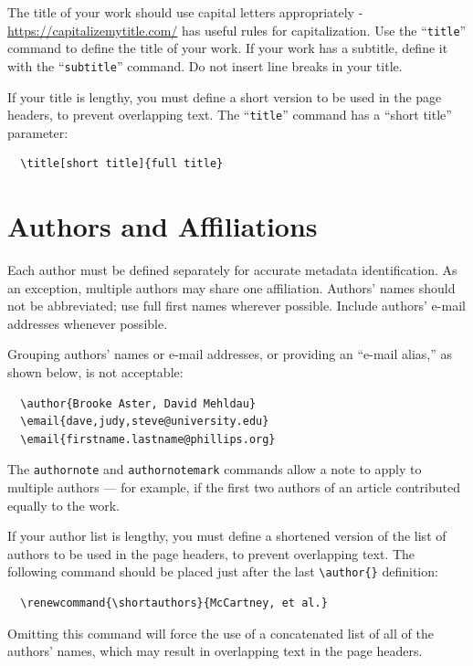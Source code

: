 \documentclass[manuscript,screen,review]{acmart}
\begin{document}
The title of your work should use capital letters appropriately -
\url{https://capitalizemytitle.com/} has useful rules for
capitalization. Use the ``\texttt{title}'' command to define the title
of your work. If your work has a subtitle, define it with the
``\texttt{subtitle}'' command. Do not insert line breaks in your title.

If your title is lengthy, you must define a short version to be used in
the page headers, to prevent overlapping text. The ``\texttt{title}''
command has a ``short title'' parameter:

\begin{verbatim}
  \title[short title]{full title}
\end{verbatim}

\hypertarget{authors-and-affiliations}{%
\section{Authors and Affiliations}\label{authors-and-affiliations}}

Each author must be defined separately for accurate metadata
identification. As an exception, multiple authors may share one
affiliation. Authors' names should not be abbreviated; use full first
names wherever possible. Include authors' e-mail addresses whenever
possible.

Grouping authors' names or e-mail addresses, or providing an ``e-mail
alias,'' as shown below, is not acceptable:

\begin{verbatim}
  \author{Brooke Aster, David Mehldau}
  \email{dave,judy,steve@university.edu}
  \email{firstname.lastname@phillips.org}
\end{verbatim}

The \texttt{authornote} and \texttt{authornotemark} commands allow a
note to apply to multiple authors --- for example, if the first two
authors of an article contributed equally to the work.

If your author list is lengthy, you must define a shortened version of
the list of authors to be used in the page headers, to prevent
overlapping text. The following command should be placed just after the
last \texttt{\textbackslash{}author\{\}} definition:

\begin{verbatim}
  \renewcommand{\shortauthors}{McCartney, et al.}
\end{verbatim}

Omitting this command will force the use of a concatenated list of all
of the authors' names, which may result in overlapping text in the page
headers.
\end{document}
